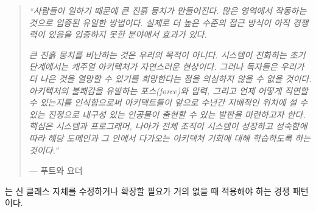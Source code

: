 \documentclass[a4paper,10pt,twoside]{book}
\begin{document}
\begin{quotation}
\noindent
\emph{``사람들이 일하기 때문에 큰 진흙 뭉치가 만들어진다. 많은 영역에서 작동하는 것으로 입증된 유일한 방법이다. 실제로 더 높은 수준의 접근 방식이 아직 경쟁력이 있음을 입증하지 못한 분야에서 효과가 있다.}

\emph{큰 진흙 뭉치를 비난하는 것은 우리의 목적이 아니다. 시스템이 진화하는 초기 단계에서는 캐주얼 아키텍처가 자연스러운 현상이다. 그러나 독자들은 우리가 더 나은 것을 열망할 수 있기를 희망한다는 점을 의심하지 않을 수 없을 것이다. 아키텍처의 불쾌감을 유발하는 포스(force)와 압력, 그리고 언제 어떻게 직면할 수 있는지를 인식함으로써 아키텍트들이 앞으로 수년간 지배적인 위치에 설 수 있는 진정으로 내구성 있는 인공물이 출현할 수 있는 발판을 마련하고자 한다. 핵심은 시스템과 프로그래머, 나아가 전체 조직이 시스템이 성장하고 성숙함에 따라 해당 도메인과 그 안에서 다가오는 아키텍처 기회에 대해 학습하도록 하는 것이다.'' }

\hfill --- 푸트와 요더 \cite{Foot00a}
\end{quotation}

는 신 클래스 자체를 수정하거나 확장할 필요가 거의 없을 때 적용해야 하는 경쟁 패턴이다.

\ifx\wholebook\relax\else
   
   
   
\end{document}
